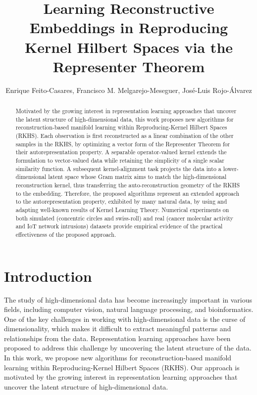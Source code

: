 \documentclass{article}
\begin{document}
\title{Learning Reconstructive Embeddings in Reproducing Kernel Hilbert Spaces via the Representer Theorem}

\author{Enrique Feito-Casares, Francisco M. Melgarejo-Meseguer, José-Luis Rojo-Álvarez}

\maketitle

\begin{abstract}
Motivated by the growing interest in representation learning approaches that uncover the latent structure of high-dimensional data, this work proposes new algorithms for reconstruction-based manifold learning within Reproducing-Kernel Hilbert Spaces (RKHS). Each observation is first reconstructed as a linear combination of the other samples in the RKHS, by optimizing a vector form of the Representer Theorem for their autorepresentation property. A separable operator-valued kernel extends the formulation to vector-valued data while retaining the simplicity of a single scalar similarity function. A subsequent kernel-alignment task projects the data into a lower-dimensional latent space whose Gram matrix aims to match the high-dimensional reconstruction kernel, thus transferring the auto-reconstruction geometry of the RKHS to the embedding. Therefore, the proposed algorithms represent an extended approach to the autorepresentation property, exhibited by many natural data, by using and adapting well-known results of Kernel Learning Theory. Numerical experiments on both simulated (concentric circles and swiss-roll) and real (cancer molecular activity and IoT network intrusions) datasets provide empirical evidence of the practical effectiveness of the proposed approach.
\end{abstract}

\section{Introduction}

The study of high-dimensional data has become increasingly important in various fields, including computer vision, natural language processing, and bioinformatics. One of the key challenges in working with high-dimensional data is the curse of dimensionality, which makes it difficult to extract meaningful patterns and relationships from the data. Representation learning approaches have been proposed to address this challenge by uncovering the latent structure of the data. In this work, we propose new algorithms for reconstruction-based manifold learning within Reproducing-Kernel Hilbert Spaces (RKHS). Our approach is motivated by the growing interest in representation learning approaches that uncover the latent structure of high-dimensional data.
\end{document}
